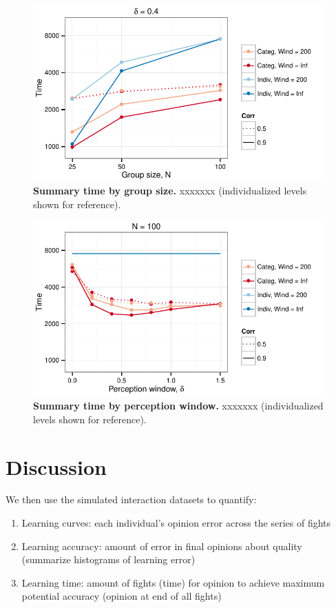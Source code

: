 \begin{figure}
\caption{\sffamily\small\textbf{Summary time by group size.}
     xxxxxxx (individualized levels shown for reference).}
\label{summary_time_groupsize}
\includegraphics[width=.8\textwidth]{figures/summary_time_groupsize.pdf}
\end{figure}

\begin{figure}
\caption{\sffamily\small\textbf{Summary time by perception window.}
     xxxxxxx (individualized levels shown for reference).}
\label{summary_time_percwindow}
\includegraphics[width=.8\textwidth]{figures/summary_time_percwindow.pdf}
\end{figure}

\section*{Discussion}




\newpage






We then use the simulated interaction datasets to quantify: 
\begin{enumerate}
  \item Learning curves: each individual's opinion error across the series of fights 
  \item Learning accuracy: amount of error in final opinions about quality (summarize histograms of learning error)
  \item Learning time: amount of fights (time) for opinion to achieve maximum potential accuracy (opinion at end of all fights)  
\end{enumerate}
